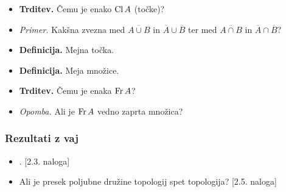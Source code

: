 \begin{enumerate}
\begin{itemize}
        \item \colorbox{blue!30}{\textbf{Trditev.}} Čemu je enako $\operatorname{Cl} A$ (točke)? 
        \item \colorbox{yellow!30}{\emph{Primer.}} Kakšna zvezna med $\overline{A \cup B}$ in $\overline{A} \cup \overline{B}$ ter med $\overline{A \cap B}$ in $\overline{A} \cap \overline{B}$?
        \item \colorbox{purple!30}{\textbf{Definicija.}} Mejna točka.
        \item \colorbox{purple!30}{\textbf{Definicija.}} Meja množice.
        \item \colorbox{blue!30}{\textbf{Trditev.}} Čemu je enaka $\operatorname{Fr} A$?
        \item \colorbox{yellow!30}{\emph{Opomba.}} Ali je $\operatorname{Fr} A$ vedno zaprta množica?
    \end{itemize}
\end{enumerate}

\subsubsection*{Rezultati z vaj}
\begin{itemize}
    \item {}. [2.3. naloga] 
    \item Ali je presek poljubne družine topologij spet topologija? [2.5. naloga]
\end{itemize}


